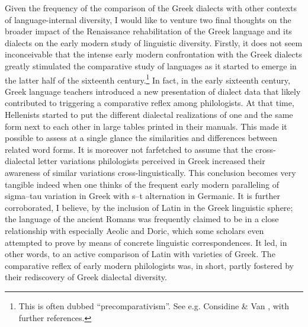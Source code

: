 \documentclass[output=paper]{langsci/langscibook}
\begin{document}
Given the frequency of the comparison of the Greek dialects with other contexts of language-internal diversity, I would like to venture two final thoughts on the broader impact of the Renaissance rehabilitation of the Greek language and its dialects on the early modern study of linguistic diversity. Firstly, it does not seem inconceivable that the intense early modern confrontation with the Greek dialects greatly stimulated the comparative study of languages as it started to emerge in the latter half of the sixteenth century.\footnote{This is often dubbed “precomparativism”. See e.g. Considine \& Van \citet{Hal2010}, with further references.} In fact, in the early sixteenth century, Greek language teachers introduced a new presentation of dialect data that likely contributed to triggering a comparative reflex among philologists. At that time, Hellenists started to put the different dialectal realizations of one and the same form next to each other in large tables printed in their manuals. This made it possible to assess at a single glance the similarities and differences between related word forms. It is moreover not farfetched to assume that the cross-dialectal letter variations philologists perceived in Greek increased their awareness of similar variations cross-linguistically. This conclusion becomes very tangible indeed when one thinks of the frequent early modern paralleling of sigma–tau variation in Greek with s–t alternation in Germanic. It is further corroborated, I believe, by the inclusion of Latin in the Greek linguistic sphere; the language of the ancient Romans was frequently claimed to be in a close relationship with especially Aeolic and Doric, which some scholars even attempted to prove by means of concrete linguistic correspondences. It led, in other words, to an active comparison of Latin with varieties of Greek. The comparative reflex of early modern philologists was, in short, partly fostered by their rediscovery of Greek dialectal diversity.
\end{document}
